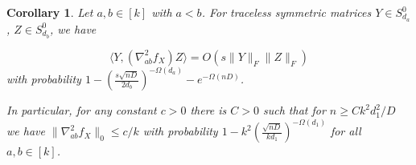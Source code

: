 \documentclass{article}
\newtheorem{corollary}[theorem]{Corollary}
\newcommand\smallSym{S}
\newcommand\rv{X}
\newcommand{\TODO}[1]{{\color{blue}[TODO: #1]}}
\begin{document}
\begin{corollary}\label{cor:off-diag-hess} Let $a,b \in [k]$ with $a < b$. For traceless symmetric matrices $Y \in \smallSym^0_{d_a}$, $Z \in \smallSym^0_{d_b}$, we have 

$$ \langle Y,  \left( \nabla^2_{ab} f_{\rv} \right) Z \rangle
= O \left(s \|Y\|_F\|Z\|_F\right)
$$
with probability %
$1 - \left(\frac {s \sqrt{nD}}{2d_b}\right)^{ - \Omega(d_a)} - e^{- \Omega(nD)}$.

In particular, for any constant $c>0$ there is $C>0$ such that for $n \geq C k^2 d_1^2/D$ we have $\|\nabla^2_{ab} f_{\rv}\|_0 \leq c/k$ with probability $1 - k^2 \left(\frac {\sqrt{nD}}{kd_1}\right)^{ - \Omega(d_1)}$ for all $a,b \in [k]$. 


\end{corollary}
\end{document}
